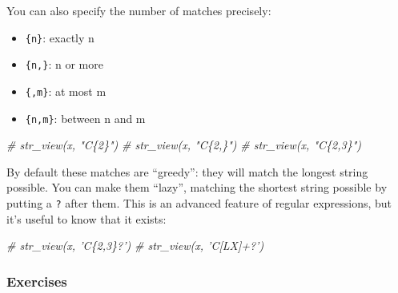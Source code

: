 \documentclass[]{book}
\newenvironment{Shaded}{\begin{snugshade}}{\end{snugshade}}
\newcommand{\CommentTok}[1]{\textcolor[rgb]{0.56,0.35,0.01}{\textit{{#1}}}}
\providecommand{\tightlist}{%
  \setlength{\itemsep}{0pt}\setlength{\parskip}{0pt}}
\begin{document}
You can also specify the number of matches precisely:

\begin{itemize}
\tightlist
\item
  \texttt{\{n\}}: exactly n
\item
  \texttt{\{n,\}}: n or more
\item
  \texttt{\{,m\}}: at most m
\item
  \texttt{\{n,m\}}: between n and m
\end{itemize}

\begin{Shaded}
\begin{Highlighting}[]
\CommentTok{# str_view(x, "C\{2\}")}
\CommentTok{# str_view(x, "C\{2,\}")}
\CommentTok{# str_view(x, "C\{2,3\}")}
\end{Highlighting}
\end{Shaded}

By default these matches are ``greedy'': they will match the longest
string possible. You can make them ``lazy'', matching the shortest
string possible by putting a \texttt{?} after them. This is an advanced
feature of regular expressions, but it's useful to know that it exists:

\begin{Shaded}
\begin{Highlighting}[]
\CommentTok{# str_view(x, 'C\{2,3\}?')}
\CommentTok{# str_view(x, 'C[LX]+?')}
\end{Highlighting}
\end{Shaded}

\subsubsection{Exercises}\label{exercises-34}
\end{document}
